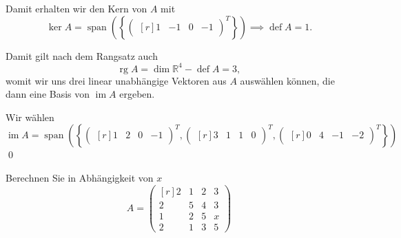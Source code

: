 \documentclass[answers]{exam}
\newcommand{\vektor}[1]{\begin{pmatrix*}[r] #1 \end{pmatrix*}}
\renewcommand{\span}[1]{\operatorname{span}\left(#1\right)}
\newcommand{\R}{\mathbb{R}}
\DeclareMathOperator{\im}{im}
\DeclareMathOperator{\defect}{def}
\DeclareMathOperator{\rg}{rg}
\begin{document}
\begin{questions}
\begin{solution}
        Damit erhalten wir den Kern von $A$ mit
        $$
            \ker A = \span{ \left\{\vektor{1 & -1 & 0 & -1}^T \right\}} \implies \defect A = 1.
        $$

        Damit gilt nach dem Rangsatz auch
        $$
            \rg A = \dim \R^4 - \defect A = 3,
        $$
        womit wir uns drei linear unabhängige Vektoren aus $A$ auswählen können, die dann eine Basis von $\im A$ ergeben.

        Wir wählen
        $$
            \im A = \span{\left\{ \vektor{1 & 2 & 0 & -1}^T, \vektor{3 & 1 & 1 & 0}^T, \vektor{0 & 4 & -1 & -2}^T \right\}}
        $$\qed
    \end{solution}

    \newpage

    \question
    Berechnen Sie in Abhängigkeit von $x$
    $$
        A = \vektor{2 & 1 & 2 & 3 \\ 2 & 5 & 4 & 3 \\ 1 & 2 & 5 & x \\ 2 & 1 & 3 & 5}
    $$
\end{questions}
\end{document}
